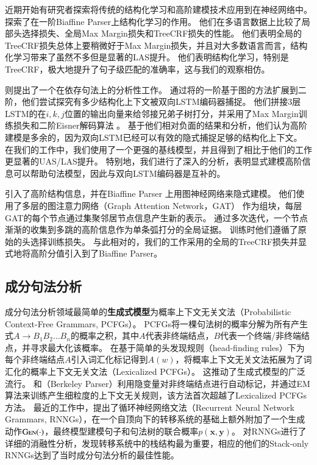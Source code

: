 近期开始有研究者探索将传统的结构化学习和高阶建模技术应用到在神经网络中。
\citet{zhang-etal-2019-empirical}探索了在一阶Biaffine Parser上结构化学习的作用。
他们在多语言数据上比较了局部头选择损失、全局Max Margin损失和TreeCRF损失的性能。
他们表明全局的TreeCRF损失总体上要稍微好于Max Margin损失，并且对大多数语言而言，结构化学习带来了虽然不多但是显著的LAS提升。
他们表明结构化学习，特别是TreeCRF，极大地提升了句子级匹配的准确率，这与我们的观察相仿。

\citet{falenska-kuhn-2019-non}则提出了一个在依存句法上的分析性工作。
通过将\citet{kiperwasser-goldberg-2016-simple}的一阶基于图的方法扩展到二阶，他们尝试探究有多少结构化上下文被双向LSTM编码器捕捉。
他们拼接3层LSTM的在$i,k,j$位置的输出向量来给邻接兄弟子树打分，并采用了Max Margin训练损失和二阶Eisner解码算法 \citep{mcdonald-pereira-2006-online}。
基于他们相对负面的结果和分析，他们认为高阶建模是多余的，因为双向LSTM已经可以有效的隐式捕捉足够的结构化上下文。
在我们的工作中，我们使用了一个更强的基线模型，并且得到了相比于他们的工作更显著的UAS/LAS提升。
特别地，我们进行了深入的分析，表明显式建模高阶信息可以帮助句法模型，因此与双向LSTM编码器是互补的。

\citet{ji-etal-2019-graph}引入了高阶结构信息，并在Biaffine Parser \citep{dozat-etal-2017-biaffine}上用图神经网络来隐式建模。
他们使用了多层的图注意力网络（Graph Attention Network，GAT） \citep{velickovic-etal-2018-graph}作为组块，每层GAT的每个节点通过集聚邻居节点信息产生新的表示。
通过多次迭代，一个节点渐渐的收集到多跳的高阶信息作为单条弧打分的全局证据。
训练时他们遵循了原始的头选择训练损失。
与此相对的，我们的工作采用的全局的TreeCRF损失并显式地将高阶分值引入到了Biaffine Parser。

\subsection{成分句法分析}

成分句法分析领域最简单的\textbf{生成式模型}为概率上下文无关文法（Probabilistic Context-Free Grammars, PCFGs）。
PCFGs将一棵句法树的概率分解为所有产生式$A\rightarrow B_1B_2\dots B_n$的概率之积，其中$A$代表非终端结点，$B$代表一个终端/非终端结点，并寻求最大化该概率。
\citet{collins-1997-three}在基于简单的头发现规则（head-finding rules）下为每个非终端结点$A$引入词汇化标记得到$A(w)$，将概率上下文无关文法拓展为了词汇化的概率上下文无关文法（Lexicalized PCFGs）。
这推动了生成式模型的广泛流行。
\citet{matsuzaki-etal-2005-probabilistic}和\citet{petrov-etal-2006-learning}（Berkeley Parser）利用隐变量对非终端结点进行自动标记，并通过EM算法来训练产生细粒度的上下文无关规则，该方法首次超越了Lexicalized PCFGs方法。
最近的工作中，\citet{dyer-etal-2016-recurrent}提出了循环神经网络文法（Recurrent Neural Network Grammars, RNNGs），在一个自顶向下的转移系统的基础上额外附加了一个生成动作$\textsc{Gen}(\cdot)$，最终模型建模句子和句法树的联合概率$p(\boldsymbol{x},\boldsymbol{y})$。
\citet{kuncoro-etal-2017-recurrent}对RNNGs进行了详细的消融性分析，发现转移系统中的栈结构最为重要，相应的他们的Stack-only RNNGs达到了当时成分句法分析的最佳性能。

